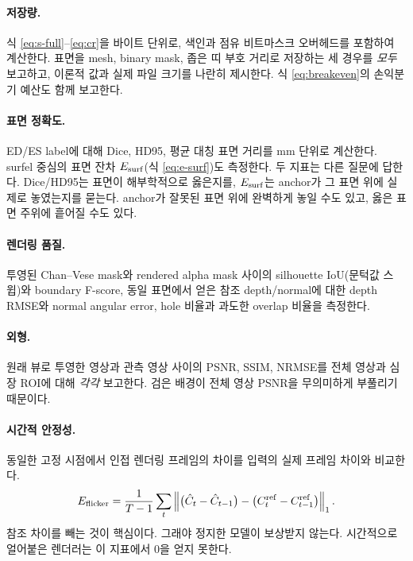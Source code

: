 \paragraph{저장량.}
식 \eqref{eq:s-full}--\eqref{eq:cr}을 바이트 단위로, 색인과 점유 비트마스크 오버헤드를
포함하여 계산한다. 표면을 mesh, binary mask, 좁은 띠 부호 거리로 저장하는 세 경우를
\emph{모두} 보고하고, 이론적 값과 실제 파일 크기를 나란히 제시한다. 식
\eqref{eq:breakeven}의 손익분기 예산도 함께 보고한다.

\paragraph{표면 정확도.}
ED/ES label에 대해 Dice, HD95, 평균 대칭 표면 거리를 mm 단위로 계산한다. surfel 중심의
표면 잔차 $E_{\mathrm{surf}}$(식 \eqref{eq:e-surf})도 측정한다. 두 지표는 다른 질문에 답한다.
Dice/HD95는 표면이 해부학적으로 옳은지를, $E_{\mathrm{surf}}$는 anchor가 그 표면 위에 실제로
놓였는지를 묻는다. anchor가 잘못된 표면 위에 완벽하게 놓일 수도 있고, 옳은 표면
주위에 흩어질 수도 있다.

\paragraph{렌더링 품질.}
투영된 Chan--Vese mask와 rendered alpha mask 사이의 silhouette IoU(문턱값 스윕)와
boundary F-score, 동일 표면에서 얻은 참조 depth/normal에 대한 depth RMSE와 normal
angular error, hole 비율과 과도한 overlap 비율을 측정한다.

\paragraph{외형.}
원래 뷰로 투영한 영상과 관측 영상 사이의 PSNR, SSIM, NRMSE를 전체 영상과 심장 ROI에
대해 \emph{각각} 보고한다. 검은 배경이 전체 영상 PSNR을 무의미하게 부풀리기 때문이다.

\paragraph{시간적 안정성.}
동일한 고정 시점에서 인접 렌더링 프레임의 차이를 입력의 실제 프레임 차이와 비교한다.
\begin{equation}
  E_{\mathrm{flicker}} = \frac{1}{T-1}\sum_t
  \left\lVert \bigl(\hat{C}_t - \hat{C}_{t-1}\bigr) - \bigl(C^{\mathrm{ref}}_t - C^{\mathrm{ref}}_{t-1}\bigr) \right\rVert_1.
  \label{eq:flicker}
\end{equation}
참조 차이를 빼는 것이 핵심이다. 그래야 정지한 모델이 보상받지 않는다. 시간적으로
얼어붙은 렌더러는 이 지표에서 0을 얻지 못한다.

